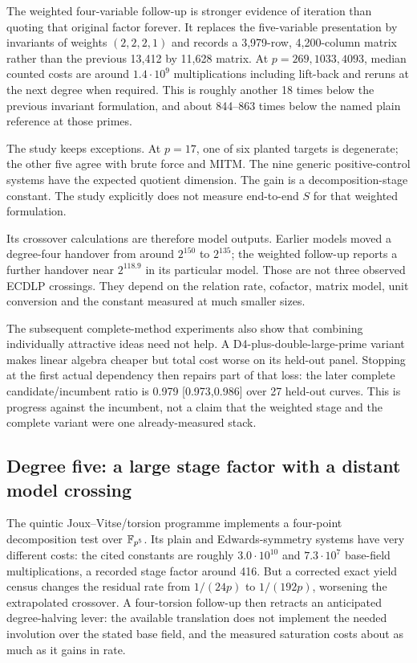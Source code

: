 The weighted four-variable follow-up is stronger evidence of iteration
than quoting that original factor forever. It replaces the five-variable
presentation by invariants of weights $(2,2,2,1)$ and records a
3,979-row, 4,200-column matrix rather than the previous 13,412 by
11,628 matrix. At $p=269,1033,4093$, median counted costs are around
$1.4\cdot10^9$ multiplications including lift-back and reruns at the
next degree when required. This is roughly another 18 times below the
previous invariant formulation, and about 844--863 times below the
named plain reference at those primes.

The study keeps exceptions. At $p=17$, one of six planted targets is
degenerate; the other five agree with brute force and MITM. The nine
generic positive-control systems have the expected quotient dimension.
The gain is a decomposition-stage constant. The study explicitly does
not measure end-to-end $S$ for that weighted formulation.

Its crossover calculations are therefore model outputs. Earlier models
moved a degree-four handover from around $2^{150}$ to $2^{135}$; the
weighted follow-up reports a further handover near $2^{118.9}$ in its
particular model. Those are not three observed ECDLP crossings. They
depend on the relation rate, cofactor, matrix model, unit conversion and
the constant measured at much smaller sizes.

The subsequent complete-method experiments also show that combining
individually attractive ideas need not help. A D4-plus-double-large-prime
variant makes linear algebra cheaper but total cost worse on its
held-out panel. Stopping at the first actual dependency then repairs
part of that loss: the later complete candidate/incumbent ratio is
0.979 [0.973,0.986] over 27 held-out curves. This is progress against the
incumbent, not a claim that the weighted stage and the complete variant
were one already-measured stack.

\subsection{Degree five: a large stage factor with a distant model crossing}

The quintic Joux--Vitse/torsion programme implements a four-point
decomposition test over $\mathbb F_{p^5}$. Its plain and Edwards-symmetry systems
have very different costs: the cited constants are roughly
$3.0\cdot10^{10}$ and $7.3\cdot10^7$ base-field multiplications, a
recorded stage factor around 416. But a corrected exact yield census
changes the residual rate from $1/(24p)$ to $1/(192p)$, worsening the
extrapolated crossover. A four-torsion follow-up then retracts an
anticipated degree-halving lever: the available translation does not
implement the needed involution over the stated base field, and the
measured saturation costs about as much as it gains in rate.

